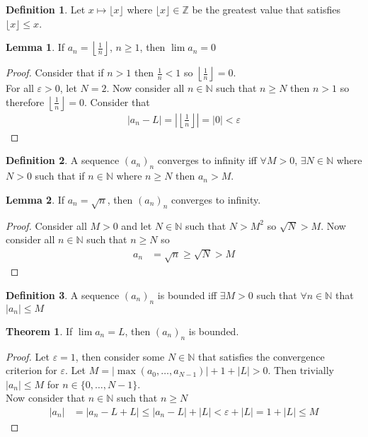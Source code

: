 \documentclass[12pt]{article}
\theoremstyle{definition}
\newtheorem{definition}{Definition}
\theoremstyle{definition}
\newtheorem{theorem}{Theorem}
\theoremstyle{definition}
\newtheorem{lemma}{Lemma}
\theoremstyle{definition}
\begin{document}
\begin{flushleft}
\begin{definition}
    Let $x \mapsto \lfloor x \rfloor$ where $\lfloor x \rfloor \in \mathbb{Z}$ be the greatest value that satisfies $\lfloor x \rfloor \leq x$.
\end{definition}

\begin{lemma}
    If $a_n = \left\lfloor\frac{1}{n}\right\rfloor$, $n \geq 1$, then $\lim a_n = 0$
\end{lemma}
\begin{proof}
    Consider that if $n > 1$ then $\frac{1}{n} < 1$ so $\left\lfloor\frac{1}{n}\right\rfloor = 0$. \\
    For all $\varepsilon > 0$, let $N = 2$. Now consider all $n \in \mathbb{N}$ such that $n \geq N$ then $n > 1$ so therefore $\left\lfloor\frac{1}{n}\right\rfloor = 0$. Consider that
    \begin{align*}
        |a_n - L| = \left|\left\lfloor\frac{1}{n}\right\rfloor\right| = |0| < \varepsilon
    \end{align*}
\end{proof}

\begin{definition}
    A sequence $(a_n)_n$ converges to infinity iff $\forall M > 0$, $\exists N \in \mathbb{N}$ where $N > 0$ such that if $n \in \mathbb{N}$ where $n \geq N$ then $a_n > M$.
\end{definition}

\begin{lemma}
    If $a_n = \sqrt{n}$, then $(a_n)_n$ converges to infinity.
\end{lemma}
\begin{proof}
    Consider all $M > 0$ and let $N \in \mathbb{N}$ such that $N > M^2$ so $\sqrt{N} > M$.
    Now consider all $n \in \mathbb{N}$ such that $n \geq N$ so
    \begin{align*}
        a_n
        &= \sqrt{n}
        \geq \sqrt{N}
        > M
    \end{align*}
\end{proof}

\begin{definition}
    A sequence $(a_n)_n$ is bounded iff $\exists M > 0$ such that $\forall n \in \mathbb{N}$ that $|a_n| \leq M$
\end{definition}

\begin{theorem}
    If $\lim a_n = L$, then $(a_n)_n$ is bounded.
\end{theorem}
\begin{proof}
    Let $\varepsilon = 1$, then consider some $N \in \mathbb{N}$ that satisfies the convergence criterion for $\varepsilon$. Let $M = \left|\max(a_0, \ldots, a_{N - 1})\right| + 1 + |L| > 0$. Then trivially $|a_n| \leq M$ for $n \in \{0, \ldots, N - 1\}$. \\
    Now consider that $n \in \mathbb{N}$ such that $n \geq N$
    \begin{align*}
        |a_n|
        &= |a_n - L + L|
        \leq |a_n - L| + |L|
        < \varepsilon + |L|
        = 1 + |L| \leq M
    \end{align*}
\end{proof}

\end{flushleft}
\end{document}
